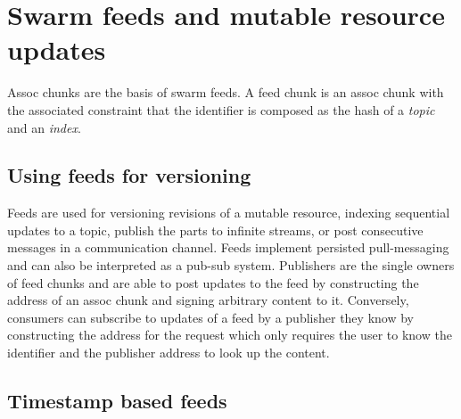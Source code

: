 



\section{Swarm feeds and mutable resource updates}\label{sec:feeds}

Assoc chunks are the basis of swarm feeds. A feed chunk is an assoc chunk with the associated constraint that the identifier is composed as the hash of a \emph{topic} and an \emph{index}. 

\subsection{Using feeds for versioning}\label{sec:feed-as-channel}

Feeds are used for versioning revisions of a mutable resource, indexing sequential updates to a topic, publish the parts to infinite streams, or post consecutive messages in a communication channel. Feeds implement persisted pull-messaging and can also be interpreted as a pub-sub system. Publishers are the single owners of feed chunks and are able to post updates to the feed by constructing the address of an assoc chunk and signing arbitrary content to it. Conversely, consumers can subscribe to updates of a feed by a publisher they know by constructing the address for the request which only requires the user to know the identifier and the publisher address to look up the content. 

\subsection{Timestamp based feeds}\label{sec:time-based-feeds}

